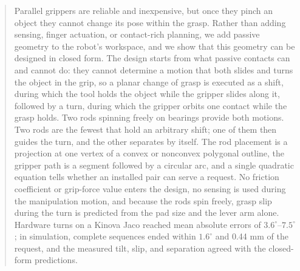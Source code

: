 \begin{abstract}
Parallel grippers are reliable and inexpensive, but once they pinch an object they cannot change its pose within the grasp. Rather than adding sensing, finger actuation, or contact-rich planning, we add passive geometry to the robot's workspace, and we show that this geometry can be designed in closed form. The design starts from what passive contacts can and cannot do: they cannot determine a motion that both slides and turns the object in the grip, so a planar change of grasp is executed as a shift, during which the tool holds the object while the gripper slides along it, followed by a turn, during which the gripper orbits one contact while the grasp holds. Two rods spinning freely on bearings provide both motions. Two rods are the fewest that hold an arbitrary shift; one of them then guides the turn, and the other separates by itself. The rod placement is a projection at one vertex of a convex or nonconvex polygonal outline, the gripper path is a segment followed by a circular arc, and a single quadratic equation tells whether an installed pair can serve a request. No friction coefficient or grip-force value enters the design, no sensing is used during the manipulation motion, and because the rods spin freely, grasp slip during the turn is predicted from the pad size and the lever arm alone. Hardware turns on a Kinova Jaco reached mean absolute errors of $3.6^{\circ}$--$7.5^{\circ}$; in simulation, complete sequences ended within $1.6^{\circ}$ and 0.44 mm of the request, and the measured tilt, slip, and separation agreed with the closed-form predictions.
\end{abstract}
